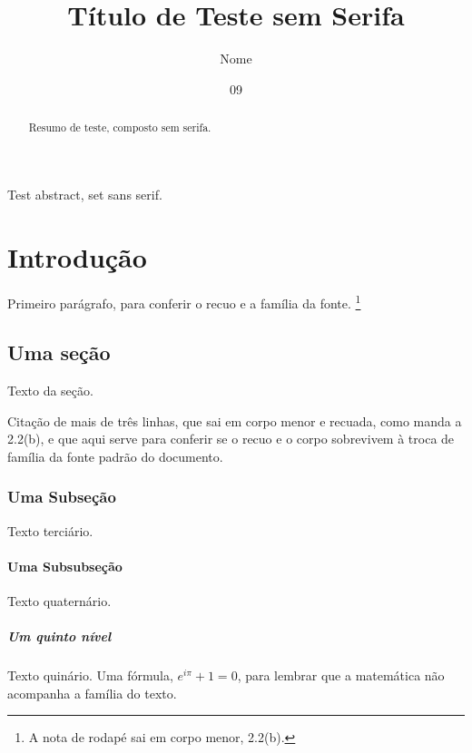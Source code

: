 \documentclass[dsc,semserifa,pdfa]{coppe}
\title{Título de Teste sem Serifa}
\author{Nome}{de Teste}
\date{09}{2026}
\begin{document}
  \maketitle
  \frontmatter
  \begin{abstract}
    Resumo de teste, composto sem serifa.
  \end{abstract}
  \begin{foreignabstract}
    Test abstract, set sans serif.
  \end{foreignabstract}
  \tableofcontents
  \mainmatter

  \chapter{Introdução}
    Primeiro parágrafo, para conferir o recuo e a família da fonte.%
    \footnote{A nota de rodapé sai em corpo menor, 2.2(b).}
  \section{Uma seção}
    Texto da seção.
    \begin{longquote}
      Citação de mais de três linhas, que sai em corpo menor e recuada,
      como manda a 2.2(b), e que aqui serve para conferir se o recuo e o
      corpo sobrevivem à troca de família da fonte padrão do documento.
    \end{longquote}
  \subsection{Uma Subseção}
    Texto terciário.
  \subsubsection{Uma Subsubseção}
    Texto quaternário.
  \paragraph{Um quinto nível}
    Texto quinário. Uma fórmula, $e^{i\pi} + 1 = 0$, para lembrar que a
    matemática não acompanha a família do texto.
\end{document}
